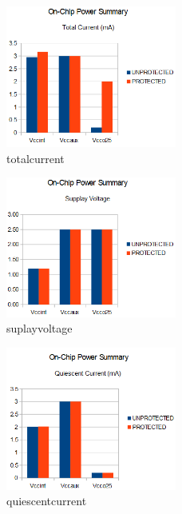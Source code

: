 \begin{figure}
	\centering
	\includegraphics[width=0.5\textwidth]
	{pics/total_current.png}
	\caption{totalcurrent}
	\label{total_current}
\end{figure}

\begin{figure}
	\centering
	\includegraphics[width=0.5\textwidth]
	{pics/suplay_voltage.png}
	\caption{suplayvoltage}
	\label{suplay_voltage}
\end{figure}

\begin{figure}
	\centering
	\includegraphics[width=0.5\textwidth]
	{pics/quiescent_current.png}
	\caption{quiescentcurrent}
	\label{quiescent_current}
\end{figure}

